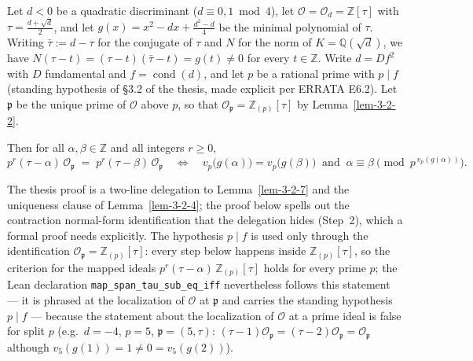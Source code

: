 
\begin{lemma}
  \label{lem-3-2-8}
  Let $d < 0$ be a quadratic discriminant ($d \equiv 0, 1 \bmod 4$), let
  $\mathcal{O} = \mathcal{O}_d = \mathbb{Z}[\tau]$ with $\tau = \tfrac{d+\sqrt d}{2}$,
  and let $g(x) = x^2 - dx + \tfrac{d^2-d}{4}$ be the minimal polynomial of $\tau$.
  Writing $\bar\tau := d - \tau$ for the conjugate of $\tau$ and $N$ for the norm of
  $K = \mathbb{Q}(\sqrt d)$, we have
  $N(\tau - t) = (\tau - t)(\bar\tau - t) = g(t) \neq 0$ for every
  $t \in \mathbb{Z}$. Write
  $d = Df^2$ with $D$ fundamental and $f = \operatorname{cond}(d)$, and let $p$ be a
  rational prime with $p \mid f$ (standing hypothesis of \S 3.2 of the thesis, made
  explicit per ERRATA E6.2). Let $\mathfrak{p}$ be the unique prime of $\mathcal{O}$
  above $p$, so that $\mathcal{O}_\mathfrak{p} = \mathbb{Z}_{(p)}[\tau]$ by
  Lemma~\ref{lem-3-2-2}.

  Then for all $\alpha, \beta \in \mathbb{Z}$ and all integers $r \geq 0$,
  \[
    p^r(\tau - \alpha)\,\mathcal{O}_\mathfrak{p} \;=\; p^r(\tau - \beta)\,\mathcal{O}_\mathfrak{p}
    \quad\Longleftrightarrow\quad
    v_p\bigl(g(\alpha)\bigr) = v_p\bigl(g(\beta)\bigr)
    \ \text{ and }\
    \alpha \equiv \beta \pmod{p^{\,v_p(g(\alpha))}} .
  \]
\end{lemma}

The thesis proof is a two-line delegation to Lemma~\ref{lem-3-2-7} and the uniqueness
clause of Lemma~\ref{lem-3-2-4}; the proof below spells out the contraction
normal-form identification that the delegation hides (Step~2), which a formal proof
needs explicitly. The hypothesis $p \mid f$ is used only through the identification
$\mathcal{O}_\mathfrak{p} = \mathbb{Z}_{(p)}[\tau]$: every step below happens inside
$\mathbb{Z}_{(p)}[\tau]$, so the criterion for the mapped ideals
$p^r(\tau-\alpha)\,\mathbb{Z}_{(p)}[\tau]$ holds for every prime $p$; the Lean
declaration \texttt{map\_span\_tau\_sub\_eq\_iff} nevertheless follows this
statement --- it is phrased at the localization of $\mathcal{O}$ at $\mathfrak{p}$
and carries the standing hypothesis $p \mid f$ --- because the statement about the
localization of $\mathcal{O}$ at a prime ideal is false for split $p$ (e.g.\ $d = -4$, $p = 5$,
$\mathfrak{p} = (5, \tau)$: $(\tau-1)\mathcal{O}_\mathfrak{p} =
(\tau-2)\mathcal{O}_\mathfrak{p} = \mathcal{O}_\mathfrak{p}$ although
$v_5(g(1)) = 1 \neq 0 = v_5(g(2))$).

